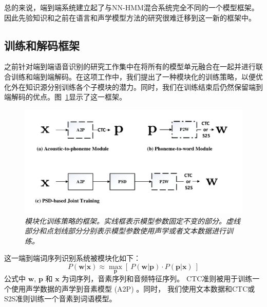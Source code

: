 总的来说，端到端系统建立起了与NN-HMM混合系统完全不同的一个模型框架。因此先验知识和之前在语言和声学模型方法的研究很难迁移到这一新的框架中。

\subsection{训练和解码框架}
\label{sec:psd_mod_framework}

之前针对端到端语音识别的研究工作集中在将所有的模型单元融合在一起并进行联合训练和端到端解码。在这项工作中，我们提出了一种模块化的训练策略，以便优化外在知识源分别训练各个子模块的潜力。同时，我们在训练结束后仍然保留端到端解码的优点。图~\ref{fig:psd_mod_framework}显示了这一框架。


\begin{figure}
  \centering
    \includegraphics[width=\linewidth]{figure/psd_mod_framework.pdf}
    \caption{\it 模块化训练策略的框架。实线框表示模型参数固定不变的部分。虚线部分和点划线部分分别表示模型参数使用声学或者文本数据进行训练。}
    \label{fig:psd_mod_framework}
\end{figure}

这一端到端词序列识别系统被模块化如下：
\begin{equation}
\label{equ:framework-1}
P(\mathbf{w}|\mathbf{x})\approx\max_{\mathbf{p}} \left[\ P(\mathbf{w}|\mathbf{p}) \cdot P(\mathbf{p}|\mathbf{x})\ \right]
\end{equation}
公式中 $\mathbf{w}$, $\mathbf{p}$ 和 $\mathbf{x}$ 为词序列，音素序列和音频特征序列。
CTC准则被用于训练一个使用声学数据的声学到音素模型 (A2P)  。同时， 我们使用文本数据和CTC或S2S准则训练一个音素到词语模型。


